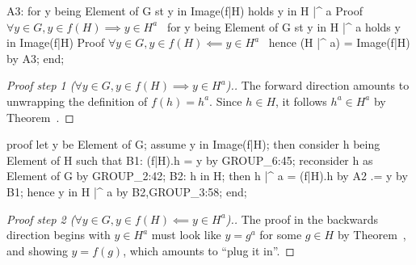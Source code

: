 A3: for y being Element of G st y in Image(f|H) holds y in H |^ a
  \LA{}Proof $\forall y\in G, y\in f(H)\implies y\in H^{a}$~{\nwtagstyle{}}\RA{}
  for y being Element of G st y in H |^ a holds y in Image(f|H)
  \LA{}Proof $\forall y\in G, y \in f(H)\impliedby y\in H^{a}$~{\nwtagstyle{}}\RA{}
  hence (H |^ a) = Image(f|H) by A3;
end;
\eatline
{}\nwendcode{}\nwdocspar
\begin{proof}[{Proof step 1 ($\forall y\in G, y\in f(H)\implies y\in H^{a}$)}.]
The forward direction amounts to unwrapping the definition of $f(h) = h^{a}$.
Since $h\in H$, it follows $h^{a}\in H^{a}$ by Theorem~.
\end{proof}

\nwenddocs{}\endmoddef\nwstartdeflinemarkup{}\nwenddeflinemarkup
proof
  let y be Element of G;
  assume y in Image(f|H);
  then consider h being Element of H such that
  B1: (f|H).h = y by GROUP_6:45;
  reconsider h as Element of G by GROUP_2:42;
  B2: h in H;
  then h |^ a = (f|H).h by A2
             .= y by B1;
  hence y in H |^ a by B2,GROUP_3:58;
end;
\nwendcode{}\nwdocspar

\begin{proof}[{Proof step 2 ($\forall y\in G, y \in f(H)\impliedby y\in H^{a}$)}.]
The proof in the backwards direction begins with $y\in H^{a}$ must look
like $y = g^{a}$ for some $g\in H$ by Theorem~,
and showing $y = f(g)$, which amounts to ``plug it in''.
\end{proof}

